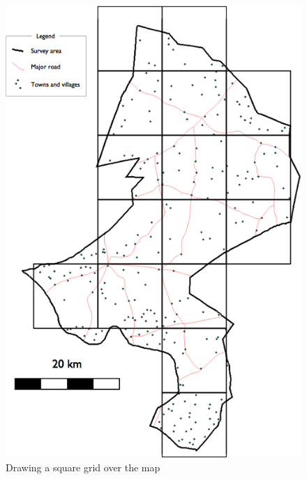 \documentclass[12pt,a4paper]{book}
\theoremstyle{definition}
\theoremstyle{definition}
\theoremstyle{definition}
\theoremstyle{remark}
\begin{document}
\begin{figure}[H]

{\centering \includegraphics{figures/mapSample2} 

}

\caption{Drawing a square grid over the map}\label{fig:sample6}
\end{figure}
\end{document}
